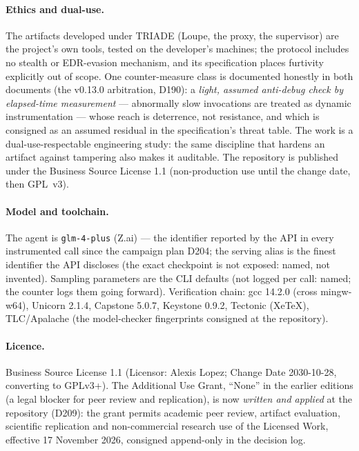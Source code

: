 \documentclass[11pt,a4paper]{article}
\newcommand{\code}[1]{\texttt{\small #1}}
\begin{document}
\paragraph{Ethics and dual-use.} The artifacts developed under TRIADE
(Loupe, the proxy, the supervisor) are the project's own tools, tested on
the developer's machines; the protocol includes no stealth or
EDR-evasion mechanism, and its specification places furtivity explicitly
out of scope. One counter-measure class is documented honestly in both
documents (the v0.13.0 arbitration, D190): a \emph{light, assumed
anti-debug check by elapsed-time measurement} --- abnormally slow
invocations are treated as dynamic instrumentation --- whose reach is
deterrence, not resistance, and which is consigned as an assumed residual
in the specification's threat table. The work is a dual-use-respectable
engineering study: the same discipline that hardens an artifact against
tampering also makes it auditable. The repository is published under the
Business Source License 1.1 (non-production use until the change date,
then GPL~v3).

\paragraph{Model and toolchain.} The agent is \code{glm-4-plus}
(Z.ai) --- the identifier reported by the API in every instrumented
call since the campaign plan D204; the serving alias is the finest
identifier the API discloses (the exact checkpoint is not exposed:
named, not invented). Sampling parameters are the CLI defaults (not
logged per call: named; the counter logs them going forward).
Verification chain: gcc 14.2.0 (cross mingw-w64), Unicorn 2.1.4,
Capstone 5.0.7, Keystone 0.9.2, Tectonic (XeTeX), TLC/Apalache (the
model-checker fingerprints consigned at the repository).

\paragraph{Licence.} Business Source License 1.1 (Licensor: Alexis
Lopez; Change Date 2030-10-28, converting to GPLv3+). The Additional
Use Grant, ``None'' in the earlier editions (a legal blocker for peer
review and replication), is now \emph{written and applied} at the
repository (D209): the grant permits academic peer review, artifact
evaluation, scientific replication and non-commercial research use of
the Licensed Work, effective 17 November 2026, consigned append-only
in the decision log.
\end{document}
